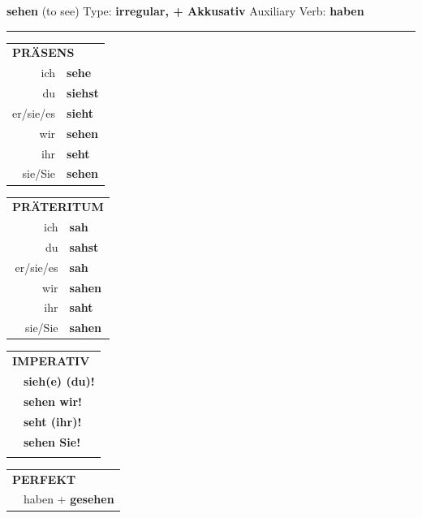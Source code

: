 \documentclass[10pt,a4paper]{revtex4-2}
\begin{document}
\begin{verbbox-acc}
    {\Large \bf sehen} (to see) \hfill Type: \textbf{irregular, + Akkusativ} \hfill Auxiliary Verb: \textbf{haben} 
    
     \vspace{5pt}

    \hrule
    
    \vspace{5pt}

  \begin{tabular}{rl}
     \multicolumn{2}{l}{\textbf{PRÄSENS} }\\
    ich & \textbf{sehe}\\
    du & \textbf{siehst}\\
    er/sie/es & \textbf{sieht}\\
    wir & \textbf{sehen}\\
    ihr & \textbf{seht}\\
    sie/Sie & \textbf{sehen}\\
  \end{tabular}
  \hfill
     \begin{tabular}{rl}
    \multicolumn{2}{l}{\textbf{PRÄTERITUM} }\\
    ich & \textbf{sah}\\
    du & \textbf{sahst}\\
    er/sie/es & \textbf{sah}\\
    wir & \textbf{sahen}\\
    ihr & \textbf{saht}\\
    sie/Sie & \textbf{sahen}\\
  \end{tabular}
  \hfill
  \begin{tabular}{rl}
     \multicolumn{2}{l}{\textbf{IMPERATIV} }\\
   & \textbf{sieh(e) (du)!}\\
   & \textbf{sehen wir!}\\
   & \textbf{seht (ihr)!}\\
   & \textbf{sehen Sie!}\\
   & \vspace{10pt}
  \end{tabular}

    \vspace{10pt}

 \begin{tabular}{rl}
     \multicolumn{2}{l}{\textbf{PERFEKT}}\\
  &  haben + \textbf{gesehen}\\
  \end{tabular}
\hfill
   \begin{tabular}{rl}
   

\end{tabular}
\end{verbbox-acc}
\end{document}
